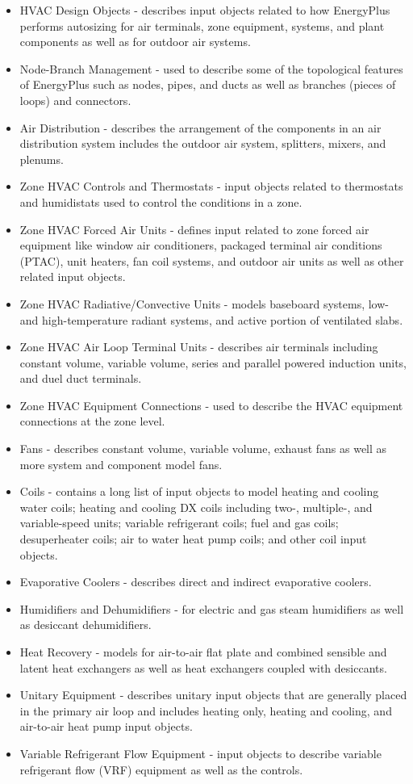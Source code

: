 \begin{itemize}
\item HVAC Design Objects - describes input objects related to how EnergyPlus
performs autosizing for air terminals, zone equipment, systems, and
plant components as well as for outdoor air systems.
\item Node-Branch Management - used to describe some of the topological
features of EnergyPlus such as nodes, pipes, and ducts as well as
branches (pieces of loops) and connectors.
\item Air Distribution - describes the arrangement of the components in
an air distribution system includes the outdoor air system, splitters,
mixers, and plenums.
\item Zone HVAC Controls and Thermostats - input objects related to thermostats
and humidistats used to control the conditions in a zone.
\item Zone HVAC Forced Air Units - defines input related to zone forced
air equipment like window air conditioners, packaged terminal air
conditions (PTAC), unit heaters, fan coil systems, and outdoor air
units as well as other related input objects.
\item Zone HVAC Radiative/Convective Units - models baseboard systems, low-
and high-temperature radiant systems, and active portion of ventilated
slabs.
\item Zone HVAC Air Loop Terminal Units - describes air terminals including
constant volume, variable volume, series and parallel powered induction
units, and duel duct terminals.
\item Zone HVAC Equipment Connections - used to describe the HVAC equipment
connections at the zone level.
\item Fans - describes constant volume, variable volume, exhaust fans as
well as more system and component model fans.
\item Coils - contains a long list of input objects to model heating and
cooling water coils; heating and cooling DX coils including two-,
multiple-, and variable-speed units; variable refrigerant coils; fuel
and gas coils; desuperheater coils; air to water heat pump coils;
and other coil input objects.
\item Evaporative Coolers - describes direct and indirect evaporative coolers.
\item Humidifiers and Dehumidifiers - for electric and gas steam humidifiers
as well as desiccant dehumidifiers.
\item Heat Recovery - models for air-to-air flat plate and combined sensible
and latent heat exchangers as well as heat exchangers coupled with
desiccants.
\item Unitary Equipment - describes unitary input objects that are generally
placed in the primary air loop and includes heating only, heating
and cooling, and air-to-air heat pump input objects.
\item Variable Refrigerant Flow Equipment - input objects to describe variable
refrigerant flow (VRF) equipment as well as the controls.
\end{itemize}
